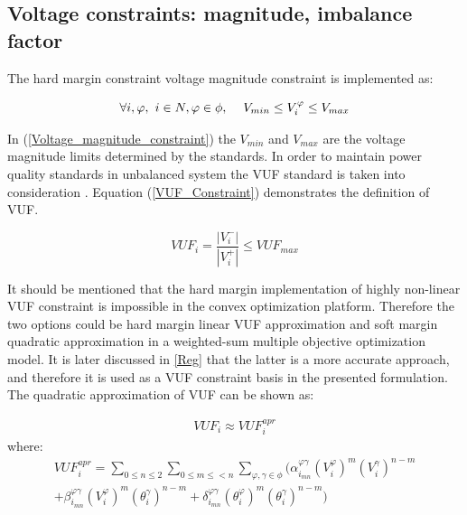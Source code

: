 \documentclass[journal]{IEEEtran}
\begin{document}
\subsection{Voltage constraints: magnitude, imbalance factor}

The hard margin constraint voltage magnitude constraint is implemented as:

\begin{equation}\label{Voltage_magnitude_constraint}
\forall i, \varphi, \hskip 0.3pc i \in N, \varphi \in \phi, \hskip 1pc V_{min} \leq V_{i}^{\varphi} \leq V_{max}
\end{equation}

In (\ref{Voltage_magnitude_constraint}) the $V_{min}$ and $V_{max}$ are the voltage magnitude limits determined by the standards. In order to maintain power quality standards in unbalanced system the VUF standard is taken into consideration \cite{smith2009ieee}. Equation (\ref{VUF_Constraint}) demonstrates the definition of VUF.

\begin{equation}\label{VUF_Constraint}
VUF_{i} = \frac {|V_{i}^{-}|} {|V_{i}^{+}|} \leq VUF_{max}
\end{equation}

It should be mentioned that the hard margin implementation of highly non-linear VUF constraint is impossible in the convex optimization platform. Therefore the two options could be hard margin linear VUF approximation and soft margin quadratic approximation in a weighted-sum multiple objective optimization model. It is later discussed in \ref{Reg} that the latter is a more accurate approach, and therefore it is used as a VUF constraint basis in the presented formulation. The quadratic approximation of VUF can be shown as:

\begin{equation}\label{VUF_apr}
\begin{split}
VUF_{i} \approx VUF_{i}^{apr} 
\end{split}
\end{equation}
where:
\begin{equation}\label{VUF_apr_simplified}
\begin{split}
VUF_{i}^{apr} = \displaystyle\sum_{0\leq n\leq2}\displaystyle\sum_{0\leq m\leq<n}\displaystyle\sum_{\varphi,\gamma\in\phi}(\alpha_{i_{mn}}^{\varphi\gamma}(V_i^\varphi)^m(V_i^\gamma)^{n-m}\\ + \beta_{i_{mn}}^{\varphi\gamma}(V_i^\varphi)^m(\theta_i^\gamma)^{n-m} + \delta_{i_{mn}}^{\varphi\gamma}(\theta_i^\varphi)^m(\theta_i^\gamma)^{n-m})
\end{split}
\end{equation}
\end{document}
